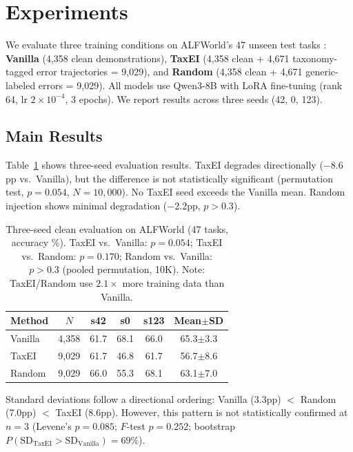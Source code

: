 \section{Experiments}
\label{sec:experiments}

We evaluate three training conditions on ALFWorld's 47 unseen test tasks \cite{shridhar2021alfworld}: \textbf{Vanilla} (4{,}358 clean demonstrations), \textbf{TaxEI} (4{,}358 clean + 4{,}671 taxonomy-tagged error trajectories = 9{,}029), and \textbf{Random} (4{,}358 clean + 4{,}671 generic-labeled errors = 9{,}029). All models use Qwen3-8B with LoRA fine-tuning (rank 64, lr $2\times10^{-4}$, 3 epochs). We report results across three seeds (42, 0, 123).

\subsection{Main Results}
\label{sec:main_results}

Table~\ref{tab:main_results} shows three-seed evaluation results. TaxEI degrades directionally ($-8.6$pp vs.\ Vanilla), but the difference is not statistically significant (permutation test, $p{=}0.054$, $N{=}10{,}000$). No TaxEI seed exceeds the Vanilla mean. Random injection shows minimal degradation ($-2.2$pp, $p{>}0.3$).

\begin{table}[t]
\centering
\small
\begin{tabular}{lccccc}
\toprule
\textbf{Method} & \textbf{$N$} & \textbf{s42} & \textbf{s0} & \textbf{s123} & \textbf{Mean$\pm$SD} \\
\midrule
Vanilla & 4{,}358 & 61.7 & 68.1 & 66.0 & 65.3$\pm$3.3 \\
TaxEI   & 9{,}029 & 61.7 & 46.8 & 61.7 & 56.7$\pm$8.6 \\
Random  & 9{,}029 & 66.0 & 55.3 & 68.1 & 63.1$\pm$7.0 \\
\bottomrule
\end{tabular}
\caption{Three-seed clean evaluation on ALFWorld (47 tasks, accuracy \%). TaxEI vs.\ Vanilla: $p{=}0.054$; TaxEI vs.\ Random: $p{=}0.170$; Random vs.\ Vanilla: $p{>}0.3$ (pooled permutation, 10K). Note: TaxEI/Random use $2.1\times$ more training data than Vanilla.}
\label{tab:main_results}
\end{table}

Standard deviations follow a directional ordering: Vanilla (3.3pp) $<$ Random (7.0pp) $<$ TaxEI (8.6pp). However, this pattern is not statistically confirmed at $n{=}3$ (Levene's $p{=}0.085$; $F$-test $p{=}0.252$; bootstrap $P(\text{SD}_\text{TaxEI} > \text{SD}_\text{Vanilla}){=}69\%$).


